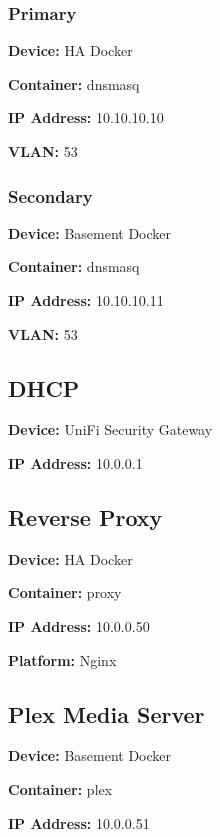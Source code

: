 \documentclass[]{article}
\begin{document}
\subsubsection{\texorpdfstring{{Primary}}{Primary}}

\textbf{Device: }
{HA Docker}

\textbf{Container: }
{dnsmasq}

\textbf{IP Address: }
{10.10.10.10}

\textbf{VLAN: }
{53}

\subsubsection{\texorpdfstring{{Secondary}}{Secondary}}

\textbf{Device: }
{Basement Docker}

\textbf{Container: }
{dnsmasq}

\textbf{IP Address: }
{10.10.10.11}

\textbf{VLAN: }
{53}

\subsection{\texorpdfstring{{DHCP}}{DHCP}}

\textbf{Device: }
{UniFi Security Gateway}

\textbf{IP Address: }
{10.0.0.1}

\subsection{\texorpdfstring{{Reverse Proxy}}{Reverse Proxy}}

\textbf{Device: }
{HA Docker}

\textbf{Container: }
{proxy}

\textbf{IP Address: }
{10.0.0.50}

\textbf{Platform: }
{Nginx}

\subsection{\texorpdfstring{{Plex Media Server}}{Plex Media Server}}

\textbf{Device: }
{Basement Docker}

\textbf{Container: }
{plex}

\textbf{IP Address: }
{10.0.0.51}

\end{document}
